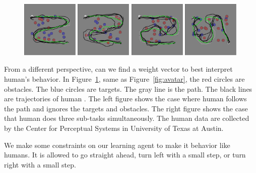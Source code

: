 \documentclass[11pt]{article} %
\begin{document}
\begin{figure}[h!]
\centering
\includegraphics[width=0.24\textwidth]{task_1.png}
\includegraphics[width=0.24\textwidth]{task_2.png}
\includegraphics[width=0.24\textwidth]{task_3.png}
\includegraphics[width=0.24\textwidth]{task_4.png}
\caption{}
\label{fig:exp}
\end{figure}

From a different perspective, can we find a weight vector to best interpret
human's behavior. In Figure~\ref{fig:exp}, same as Figure~\ref{fig:avatar}, the
red circles are obstacles. The blue circles are targets. The gray line is the
path. The black lines are trajectories of human . The left figure shows the case
where human follows the path and ignores the targets and obstacles. The right
figure shows the case that human does three sub-tasks simultaneously. The human
data are collected by the Center for Perceptual Systems in University of Texas
at Austin.

We make some constraints on our learning agent to make it behavior like humans.
It is allowed to go straight ahead, turn left with a small step, or turn right
with a small step.
\end{document}
